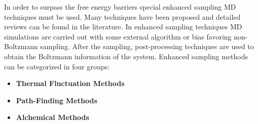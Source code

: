 In order to surpass the free energy barriers special enhanced sampling MD techniques must be 
used. Many techniques have been proposed and 
detailed reviews can be found in the literature\cite{DeVivo_JMedChem_2016,Harpole2018,Abrams2014}. 
In enhanced sampling 
techniques MD simulations are carried out with some external algorithm or bias 
favoring non-Boltzmann sampling. After the sampling, post-processing techniques 
are used to obtain the Boltzmann information of the system. Enhanced sampling methods can be 
categorized in four groups\cite{Harpole2018}:
\begin{itemize}
 \item \textbf{Thermal Fluctuation Methods} 
 \item \textbf{Path-Finding Methods} 
 \item \textbf{Alchemical Methods} 

\end{itemize}
